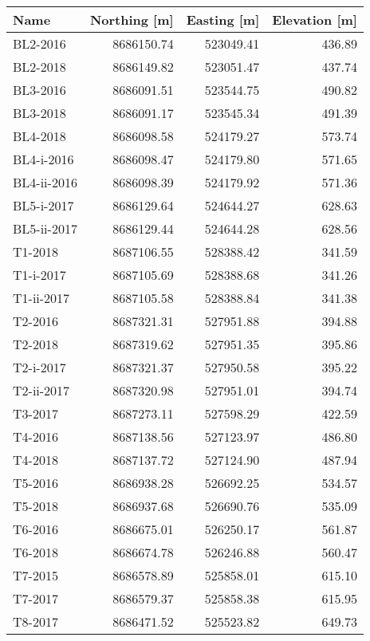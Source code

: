 \begin{tabular}{lrrr}
\toprule
        Name &  Northing [m] &  Easting [m] &  Elevation [m] \\
\midrule
    BL2-2016 &    8686150.74 &    523049.41 &         436.89 \\
    BL2-2018 &    8686149.82 &    523051.47 &         437.74 \\
    BL3-2016 &    8686091.51 &    523544.75 &         490.82 \\
    BL3-2018 &    8686091.17 &    523545.34 &         491.39 \\
    BL4-2018 &    8686098.58 &    524179.27 &         573.74 \\
  BL4-i-2016 &    8686098.47 &    524179.80 &         571.65 \\
 BL4-ii-2016 &    8686098.39 &    524179.92 &         571.36 \\
  BL5-i-2017 &    8686129.64 &    524644.27 &         628.63 \\
 BL5-ii-2017 &    8686129.44 &    524644.28 &         628.56 \\
     T1-2018 &    8687106.55 &    528388.42 &         341.59 \\
   T1-i-2017 &    8687105.69 &    528388.68 &         341.26 \\
  T1-ii-2017 &    8687105.58 &    528388.84 &         341.38 \\
     T2-2016 &    8687321.31 &    527951.88 &         394.88 \\
     T2-2018 &    8687319.62 &    527951.35 &         395.86 \\
   T2-i-2017 &    8687321.37 &    527950.58 &         395.22 \\
  T2-ii-2017 &    8687320.98 &    527951.01 &         394.74 \\
     T3-2017 &    8687273.11 &    527598.29 &         422.59 \\
     T4-2016 &    8687138.56 &    527123.97 &         486.80 \\
     T4-2018 &    8687137.72 &    527124.90 &         487.94 \\
     T5-2016 &    8686938.28 &    526692.25 &         534.57 \\
     T5-2018 &    8686937.68 &    526690.76 &         535.09 \\
     T6-2016 &    8686675.01 &    526250.17 &         561.87 \\
     T6-2018 &    8686674.78 &    526246.88 &         560.47 \\
     T7-2015 &    8686578.89 &    525858.01 &         615.10 \\
     T7-2017 &    8686579.37 &    525858.38 &         615.95 \\
     T8-2017 &    8686471.52 &    525523.82 &         649.73 \\
\bottomrule
\end{tabular}
